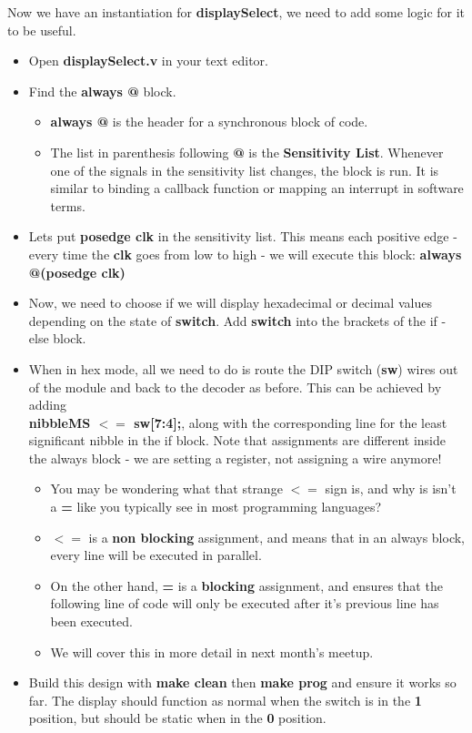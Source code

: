 \documentclass[12pt,a4paper]{article}
\begin{document}
\noindent
Now we have an instantiation for \textbf{displaySelect}, we need to add some logic for it to be useful.
\begin{itemize}
	\item Open \textbf{displaySelect.v} in your text editor. 
	\item Find the \textbf{always @} block.
	\begin{itemize}
		\item \textbf{always @} is the header for a synchronous block of code.
		\item The list in parenthesis following \textbf{@} is the \textbf{Sensitivity List}. Whenever one of the signals in the sensitivity list changes, the block is run. It is similar to binding a callback function or mapping an interrupt in software terms. 
	\end{itemize} 
		\item Lets put \textbf{posedge clk} in the sensitivity list. This means each positive edge - every time the \textbf{clk} goes from low to high - we will execute this block: \textbf{always @(posedge clk)}
		\item Now, we need to choose if we will display hexadecimal or decimal values depending on the state of \textbf{switch}. Add \textbf{switch} into the brackets of the if - else block. 
		\item When in hex mode, all we need to do is route the DIP switch (\textbf{sw}) wires out of the module and back to the decoder as before. This can be achieved by adding \\ \textbf{nibbleMS $<=$ sw[7:4];}, along with the corresponding line for the least significant nibble in the if block. Note that assignments are different inside the always block - we are setting a register, not assigning a wire anymore! 
		\begin{itemize}
			\item You may be wondering what that strange \textbf{$<=$} sign is, and why is isn't a \textbf{=} like you typically see in most programming languages?
			\item \textbf{$<=$} is a \textbf{non blocking} assignment, and means that in an always block, every line will be executed in parallel. 
			\item On the other hand, \textbf{=} is a \textbf{blocking} assignment, and ensures that the following line of code will only be executed after it's previous line has been executed. 
			\item We will cover this in more detail in next month's meetup.
		\end{itemize}
		\item Build this design with \textbf{make clean} then \textbf{make prog} and ensure it works so far. The display should function as normal when the switch is in the \textbf{1} position, but should be static when in the \textbf{0} position. 
	\end{itemize}
\end{document}
